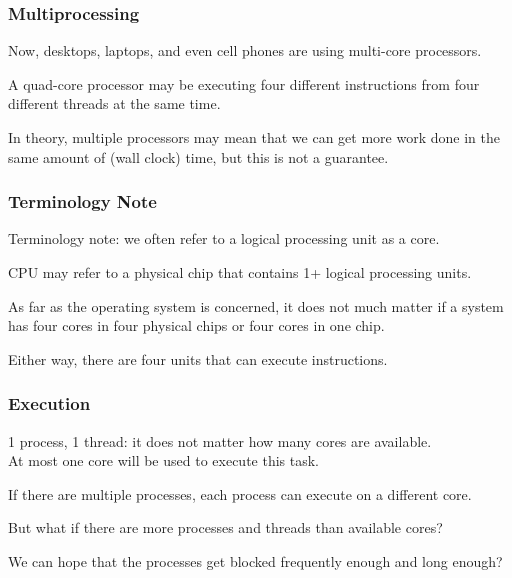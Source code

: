 \begin{frame}
	\frametitle{Multiprocessing}

	Now, desktops, laptops, and even cell phones are using multi-core processors.

	A quad-core processor may be executing four different instructions from four different threads at the same time.

	In theory, multiple processors may mean that we can get more work done in the same amount of (wall clock) time, but this is not a guarantee.

\end{frame}


\begin{frame}
	\frametitle{Terminology Note}


	Terminology note: we often refer to a logical processing unit as a \alert{core}.

	CPU may refer to a physical chip that contains 1+ logical processing units.

	As far as the operating system is concerned, it does not much matter if a system has four cores in four physical chips or four cores in one chip.

	Either way, there are four units that can execute instructions.



\end{frame}


\begin{frame}
	\frametitle{Execution}

	1 process, 1 thread: it does not matter how many cores are available.\\
	\quad At most one core will be used to execute this task.

	If there are multiple processes, each process can execute on a different core.

	But what if there are more processes and threads than available cores?

	We can hope that the processes get blocked frequently enough and long enough?



\end{frame}


